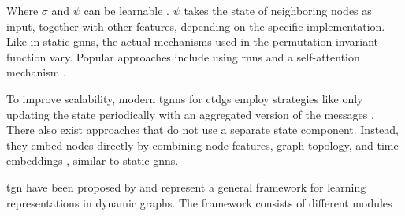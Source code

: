 Where $\sigma$ and $\psi$ can be learnable \cite{rossi_temporal_2020}. $\psi$ takes the state of neighboring nodes as input, together with other features, depending on the specific implementation. Like in static \glspl{gnn}, the actual mechanisms used in the permutation invariant function vary. Popular approaches include using \glspl{rnn} \cite{ma_streaming_2018} and a self-attention mechanism \cite{rossi_temporal_2020}.

To improve scalability, modern \glspl{tgnn} for \glspl{ctdg} employ strategies like only updating the state periodically with an aggregated version of the messages \cite{rossi_temporal_2020}. There also exist approaches that do not use a separate state component. Instead, they embed nodes directly by combining node features, graph topology, and time embeddings \cite{longa_graph_2023, xu_inductive_2020}, similar to static \glspl{gnn}.




\iffalse
\gls{tgn} have been proposed by \cite{rossi_temporal_2020} and represent a general framework for learning representations in dynamic graphs. The framework consists of different modules

